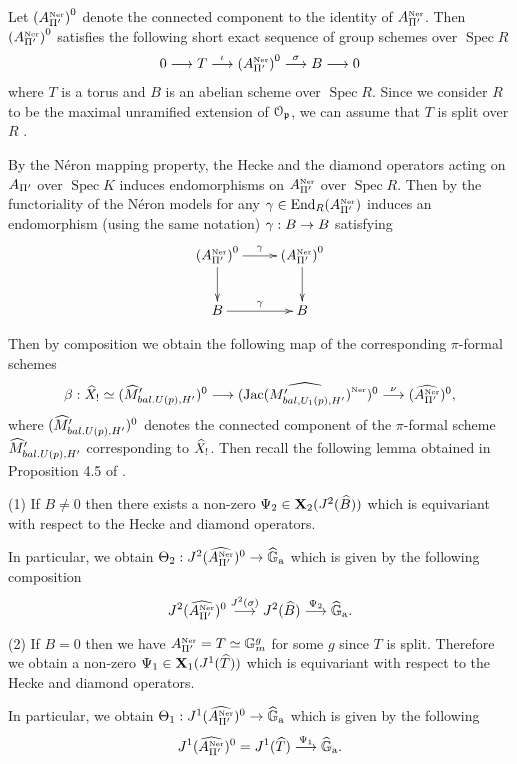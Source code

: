 \documentclass{amsart}
\def \hG{\widehat{\mathbb{G}}_{\mathrm{a}}}
\numberwithin{equation}{section}
\def \mb{\mbox}
\newcommand{\Cs}{M'_{bal,U_1(p),H'}}
\newcommand{\Jac}{\mb{Jac}(\Cs)}
\newcommand{\ner}{\mb{\tiny Ner}}
\DeclareMathOperator{\Spec}{\mathrm{Spec}}
\newcommand{\End}{\mathrm{End}}
\begin{document}
Let ${(A_{\pip'}^{\ner})}^0$ denote the connected component to the identity of 
$A_{\pip'}^{\ner}$. Then ${(A_{\pip'}^{\ner})}^0$ satisfies the following short 
exact sequence of group schemes over $\Spec R$
\begin{align}
0 \longrightarrow T \stk{\iota}{\longrightarrow} {(A_{\pip'}^{\ner})}^{0} 
\stk{\sigma}{\longrightarrow} B \longrightarrow 0 
\end{align}
where $T$ is a torus and $B$ is an abelian scheme over $\Spec R$. Since we 
consider $R$ to be the maximal unramified extension of $\mathcal{O}_{\mathfrak{p}}$, 
we can assume that $T$ is split over $R$ \cite{MR1083353}. 

By the N\'{e}ron mapping property, the Hecke and the diamond operators 
acting on $A_{\Pi'}$ over $\Spec K$ induces endomorphisms on 
$A_{\pip'}^{\ner}$ over 
$\Spec R$. Then by the functoriality of the N\'{e}ron models for any 
$\gamma \in \End_R(A_{\pip'}^{\ner})$ induces an endomorphism 
(using the same notation) $\gamma: B \rightarrow B$ satisfying
$$\xymatrix{
{(A_{\pip'}^{\ner})}^0 \ar[d] \ar[r]^\gamma & {(A_{\pip'}^{\ner})}^0 \ar[d] \\
B \ar[r]^{\gamma} & B 
}$$

Then by composition we 
obtain the following map of the corresponding $\pi$-formal schemes
\begin{align}
\label{beta}
\beta: \ohat{X}_! \simeq  (\MU)^0 \longrightarrow (\ohat{\Ner{\Jac}})^0 
\stk{\nu}{\longrightarrow} (\ohat{A_{\pip'}^{\ner}})^0,
\end{align}
where $({\widehat{M}}'_{bal.U(p),H'})^0$ denotes the connected component of the $\pi$-formal scheme
${\widehat{M}}'_{bal.U(p),H'}$ corresponding to $\widehat{X}_!$.
Then recall the following lemma obtained in Proposition 4.5 of \cite{MR2400054}.

\begin{lemma}
\label{theta}
(1) If $B \ne 0$ then there exists a non-zero $\Psi_2 \in 
{\bf X}_2(J^2 (\widehat{B}))$
which is equivariant with respect to the Hecke and diamond operators.

In particular, we obtain $\Theta_2 : J^2(\ohat{A_{\pip'}^{\ner}})^0  \map \hG$ 
which is given by the following composition 
$$ 
J^2(\ohat{A_{\pip'}^{\ner}})^0 
\stk{J^2(\sigma)}{\longrightarrow} J^2(\ohat{B}) \stk{\Psi_2}{\longrightarrow}
 \hG.
$$

(2) If $B =0$ then we have 
 $A_{\pip'}^{\ner} = T \simeq \bb{G}_m^g$ for some $g$ since
$T$ is split. Therefore we obtain a non-zero $\Psi_1 \in {\bf X}_1(J^1(\widehat{T}))$
which is equivariant with respect to the Hecke and diamond operators.

In particular, we obtain $\Theta_1: J^1(\ohat{A_{\pip'}^{\ner}})^0 
\map \hG$ which is given by the following 
$$
J^1(\ohat{A_{\pip'}^{\ner}})^0 = J^1(\ohat{T}) \stk{\Psi_1}{\longrightarrow} \hG.
$$

\end{lemma}
\end{document}
